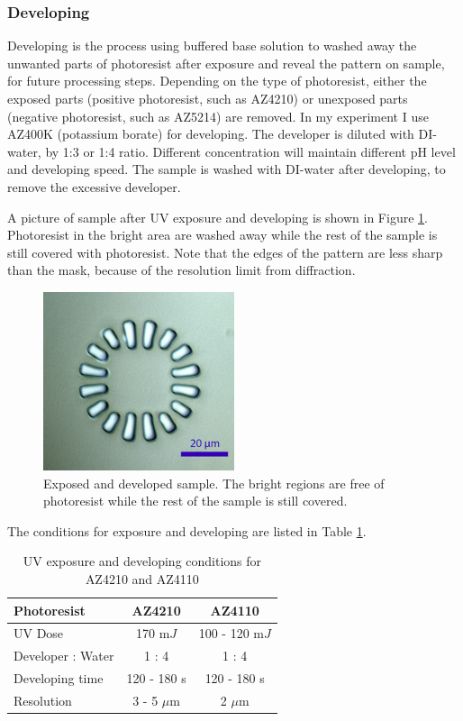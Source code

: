 \documentclass[pdflatex, sectionletters, 12pt]{pittetd}    %
\begin{document}
\subsubsection{Developing}

Developing is the process using buffered base solution to washed away the unwanted parts of photoresist after exposure and reveal the pattern on sample, for future processing steps. Depending on the type of photoresist, either the exposed parts (positive photoresist, such as AZ4210) or unexposed parts (negative photoresist, such as AZ5214) are removed. In my experiment I use AZ400K (potassium borate) for developing. The developer is diluted with DI-water, by 1:3 or 1:4 ratio. Different concentration will maintain different pH level and developing speed. The sample is washed with DI-water after developing, to remove the excessive developer. 

A picture of sample after UV exposure and developing is shown in Figure \ref{FIG:Developed}. Photoresist in the bright area are washed away while the rest of the sample is still covered with photoresist. Note that the edges of the pattern are less sharp than the mask, because of the resolution limit from diffraction. 
\\
\begin{figure}[h!]
	\centering
	\includegraphics[width=0.5\textwidth]{Drawing/Developed.png}
	\caption{Exposed and developed sample. The bright regions are free of photoresist while the rest of the sample is still covered.}
	\label{FIG:Developed}
\end{figure}

The conditions for exposure and developing are listed in Table \ref{TAB:photoresistsExposureDeveloping}.

\begin{table}[h!]
	\centering
	\begin{tabular}{l|cc}
		\hline
		Photoresist	&	AZ4210	&	AZ4110 \\ \hline
		UV Dose	&	170 m$J$	& 100 - 120 m$J$	\\ 
		Developer : Water	&	1 : 4	&	1 : 4	\\
		Developing time	&	120 - 180 s	&	120 - 180 s \\ 
		Resolution	&	3 - 5 $\mu$m	&	2 $\mu$m	\\ \hline
	\end{tabular}
	\caption{UV exposure and developing conditions for AZ4210 and AZ4110}
	\label{TAB:photoresistsExposureDeveloping}	
\end{table}
\end{document}
